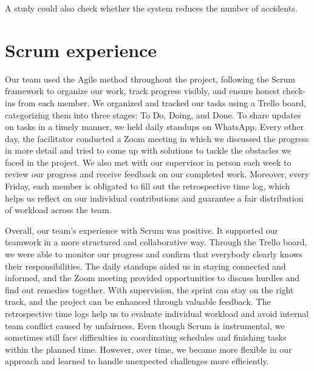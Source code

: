 \documentclass[12pt]{article}
\begin{document}
A study could also check whether the system reduces the number of accidents.

\clearpage
\section{Scrum experience}
Our team used the Agile method throughout the project, following the Scrum framework to organize our work, track progress visibly, and ensure honest check-ins from each member. We organized and tracked our tasks using a Trello board, categorizing them into three stages: To Do, Doing, and Done. To share updates on tasks in a timely manner, we held daily standups on WhatsApp. Every other day, the facilitator conducted a Zoom meeting in which we discussed the progress in more detail and tried to come up with solutions to tackle the obstacles we faced in the project. We also met with our supervisor in person each week to review our progress and receive feedback on our completed work. Moreover, every Friday, each member is obligated to fill out the retrospective time log, which helps us reflect on our individual contributions and guarantee a fair distribution of workload across the team.

Overall, our team’s experience with Scrum was positive. It supported our teamwork in a more structured and collaborative way. Through the Trello board, we were able to monitor our progress and confirm that everybody clearly knows their responsibilities. The daily standups aided us in staying connected and informed, and the Zoom meeting provided opportunities to discuss hurdles and find out remedies together. With supervision, the sprint can stay on the right track, and the project can be enhanced through valuable feedback. The retrospective time logs help us to evaluate individual workload and avoid internal team conflict caused by unfairness. Even though Scrum is instrumental, we sometimes still face difficulties in coordinating schedules and finishing tasks within the planned time. However, over time, we became more flexible in our approach and learned to handle unexpected challenges more efficiently.

\newpage



\end{document}

